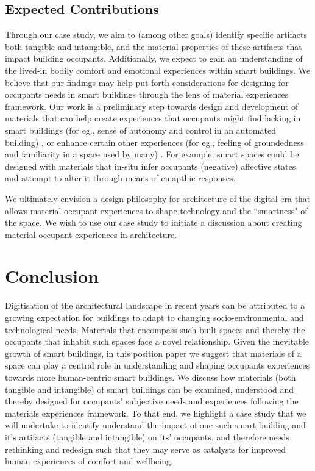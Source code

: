 \documentclass[manuscript, anonymous, review]{acmart}
\begin{document}
\subsection{Expected Contributions}
Through our case study, we aim to (among other goals) identify specific artifacts both tangible and intangible, and the material properties of these artifacts that impact building occupants. Additionally, we expect to gain an understanding of the lived-in bodily comfort and emotional experiences within smart buildings. We believe that our findings may help put forth considerations for designing for occupants needs in smart buildings through the lens of material experiences framework. Our work is a preliminary step towards design and development of materials that can help create experiences that occupants might find lacking in smart buildings (for eg., sense of autonomy and control in an automated building) \cite{moreno2014user}, or enhance certain other experiences (for eg., feeling of groundedness and familiarity in a space used by many) \cite{rehman2022personalisedcomfort}.  For example, smart spaces could be designed with materials that in-situ infer occupants (negative) affective states, and attempt to alter it through means of emapthic responses. 

We ultimately envision a design philosophy for architecture of the digital era that allows material-occupant experiences to shape technology and the ``smartness" of the space. We wish to use our case study to initiate a discussion about creating material-occupant experiences in architecture.


\section{Conclusion}
Digitisation of the architectural landscape in recent years can be attributed to a growing expectation for buildings to adapt to changing socio-environmental and technological needs. Materials that encompass such built spaces and thereby the occupants that inhabit such spaces face a novel relationship. Given the inevitable growth of smart buildings, in this position paper we suggest that materials of a space can play a central role in understanding and shaping occupants experiences towards more human-centric smart buildings. We discuss how materials (both tangible and intangible) of smart buildings can be examined, understood and thereby designed for occupants' subjective needs and experiences following the materials experiences framework. To that end, we highlight a case study that we will undertake to identify understand the impact of one such smart building and it's artifacts (tangible and intangible) on its'  occupants, and therefore needs rethinking and redesign such that they may serve as catalysts for improved human experiences of comfort and wellbeing. 




\end{document}
